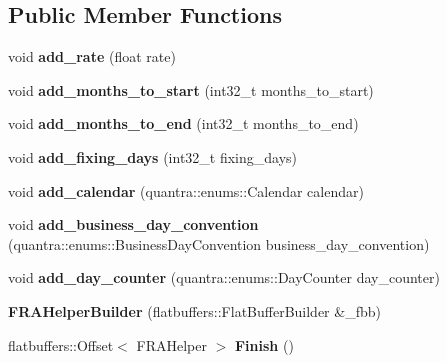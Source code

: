\subsection*{Public Member Functions}
\begin{DoxyCompactItemize}
\item 
\mbox{\label{structquantra_1_1FRAHelperBuilder_a8f2209ddaace66349027bb3a011262fc}} 
void {\bfseries add\+\_\+rate} (float rate)
\item 
\mbox{\label{structquantra_1_1FRAHelperBuilder_a757bda3d0d738ed6f927540e9d9396ba}} 
void {\bfseries add\+\_\+months\+\_\+to\+\_\+start} (int32\+\_\+t months\+\_\+to\+\_\+start)
\item 
\mbox{\label{structquantra_1_1FRAHelperBuilder_ace31509f429621c41abefee189c7e2d6}} 
void {\bfseries add\+\_\+months\+\_\+to\+\_\+end} (int32\+\_\+t months\+\_\+to\+\_\+end)
\item 
\mbox{\label{structquantra_1_1FRAHelperBuilder_a622af7c0bdc1208263462876e9db7d53}} 
void {\bfseries add\+\_\+fixing\+\_\+days} (int32\+\_\+t fixing\+\_\+days)
\item 
\mbox{\label{structquantra_1_1FRAHelperBuilder_a98d73964e3ed416b7468a6abe050ed4c}} 
void {\bfseries add\+\_\+calendar} (quantra\+::enums\+::\+Calendar calendar)
\item 
\mbox{\label{structquantra_1_1FRAHelperBuilder_ab4a88997c48eb9a89bd1b2e9c00883d0}} 
void {\bfseries add\+\_\+business\+\_\+day\+\_\+convention} (quantra\+::enums\+::\+Business\+Day\+Convention business\+\_\+day\+\_\+convention)
\item 
\mbox{\label{structquantra_1_1FRAHelperBuilder_a1c7eb34dcc90ac3dac47cdeadb6a4a8f}} 
void {\bfseries add\+\_\+day\+\_\+counter} (quantra\+::enums\+::\+Day\+Counter day\+\_\+counter)
\item 
\mbox{\label{structquantra_1_1FRAHelperBuilder_a1feedf26bdee448b918f0c6594fc7b8b}} 
{\bfseries F\+R\+A\+Helper\+Builder} (flatbuffers\+::\+Flat\+Buffer\+Builder \&\+\_\+fbb)
\item 
\mbox{\label{structquantra_1_1FRAHelperBuilder_ae57ce7154b529ce8ef32db90cdefa646}} 
flatbuffers\+::\+Offset$<$ F\+R\+A\+Helper $>$ {\bfseries Finish} ()
\end{DoxyCompactItemize}
